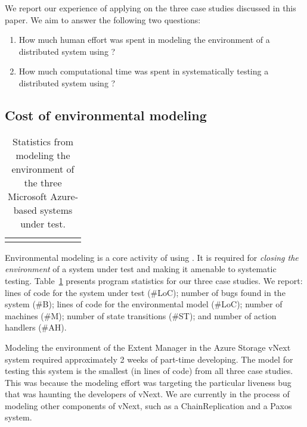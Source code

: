 We report our experience of applying \psharp on the three case studies discussed in this paper. We aim to answer the following two questions:

\begin{enumerate}
\item How much human effort was spent in modeling the environment of a distributed system using \psharp?

\item How much computational time was spent in systematically testing a distributed system using \psharp?
\end{enumerate}

\subsection{Cost of environmental modeling}
\label{sec:eval:human_cost}

\newcommand{\colspacing}{\hspace{1.8em}}
\begin{table}[t]
\small
\centering
\setlength{\tabcolsep}{0.3em}
\begin{tabular}{l rrrrr rr}
\centering

\end{tabular}
\caption{Statistics from modeling the environment of the three Microsoft Azure-based systems under test.}
\label{tab:stats}
\end{table}

Environmental modeling is a core activity of using \psharp. It is required for \emph{closing the environment} of a system under test and making it amenable to systematic testing. Table~\ref{tab:stats} presents program statistics for our three case studies. We report: lines of code for the system under test (\#LoC); number of bugs found in the system (\#B); lines of \psharp code for the environmental model (\#LoC); number of machines (\#M); number of state transitions (\#ST); and number of action handlers (\#AH).

Modeling the environment of the Extent Manager in the Azure Storage vNext system required approximately 2 weeks of part-time developing. The \psharp model for testing this system is the smallest (in lines of code) from all three case studies. This was because the modeling effort was targeting the particular liveness bug that was haunting the developers of vNext. We are currently in the process of modeling other components of vNext, such as a ChainReplication and a Paxos system.

